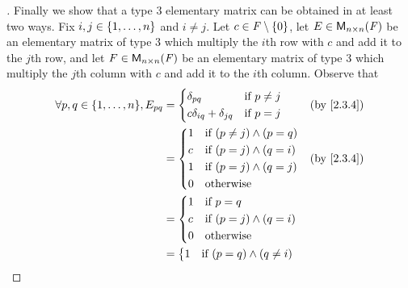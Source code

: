 \begin{proof}[]
	Finally we show that a type 3 elementary matrix can be obtained in at least two ways.
	Fix \(i, j \in \left\lbrace1, \dots, n\right\rbrace\) and \(i \neq j\).
	Let \(c \in \mathit{F} \setminus \left\lbrace0\right\rbrace\), let \(E \in \mathsf{M}_{{n} \times n}({\mathit{F}})\) be an elementary matrix of type 3 which multiply the \(i\)th row with \(c\) and add it to the \(j\)th row, and let \(F \in \mathsf{M}_{{n} \times n}({\mathit{F}})\) be an elementary matrix of type 3 which multiply the \(j\)th column with \(c\) and add it to the \(i\)th column.
	Observe that
	\begin{align*}
		\forall p, q \in \set{1, \dots, n}, E_{p q} & = \begin{dcases}
			                                                \delta_{p q}                  & \text{if } p \neq j \\
			                                                c \delta_{i q} + \delta_{j q} & \text{if } p = j
		                                                \end{dcases} &  & \by{2.3.4}                  \\
		                                            & = \begin{dcases}
			                                                1 & \text{if } (p \neq j) \land (p = q) \\
			                                                c & \text{if } (p = j) \land (q = i)    \\
			                                                1 & \text{if } (p = j) \land (q = j)    \\
			                                                0 & \text{otherwise}
		                                                \end{dcases}             &  & \by{2.3.4}                             \\
		                                            & = \begin{dcases}
			                                                1 & \text{if } p = q                 \\
			                                                c & \text{if } (p = j) \land (q = i) \\
			                                                0 & \text{otherwise}
		                                                \end{dcases}                                 \\
		                                            & = \begin{dcases}
			                                                1 & \text{if } (p = q) \land (q \neq i) \\

\end{dcases}
\end{align*}
\end{proof}
